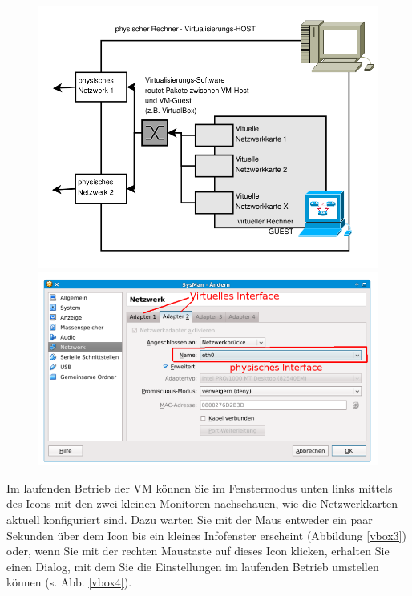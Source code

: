 \documentclass[paper=a4,fontsize=11pt]{scrartcl}%
\numberwithin{equation}{section}
\begin{document}
\begin{figure}[H]
	\centering
	\includegraphics[scale=0.4]{vbox1}
	\includegraphics[scale=0.4]{vbox2}
\end{figure}
Im laufenden Betrieb der VM können Sie im Fenstermodus unten links mittels des Icons mit den zwei
kleinen Monitoren nachschauen, wie die Netzwerkkarten aktuell konfiguriert sind. Dazu warten Sie mit
der Maus entweder ein paar Sekunden über dem Icon bis ein kleines Infofenster erscheint (Abbildung
\ref{vbox3}) oder, wenn Sie mit der rechten Maustaste auf dieses Icon klicken, erhalten Sie einen Dialog, mit dem Sie die Einstellungen im laufenden Betrieb umstellen können (s. Abb. \ref{vbox4}).
\end{document}
